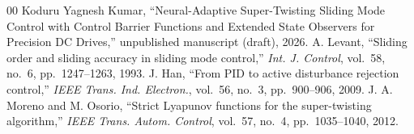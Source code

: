 \documentclass[journal,twocolumn,letterpaper]{IEEEtran}
\begin{document}
\begin{thebibliography}{00}
 Koduru Yagnesh Kumar, ``Neural-Adaptive Super-Twisting Sliding Mode Control with Control Barrier Functions and Extended State Observers for Precision DC Drives,'' unpublished manuscript (draft), 2026.
 A. Levant, ``Sliding order and sliding accuracy in sliding mode control,'' \emph{Int. J. Control}, vol.~58, no.~6, pp.~1247--1263, 1993.
 J. Han, ``From PID to active disturbance rejection control,'' \emph{IEEE Trans. Ind. Electron.}, vol.~56, no.~3, pp.~900--906, 2009.
 J. A. Moreno and M. Osorio, ``Strict Lyapunov functions for the super-twisting algorithm,'' \emph{IEEE Trans. Autom. Control}, vol.~57, no.~4, pp.~1035--1040, 2012.
\end{thebibliography}
\end{document}
